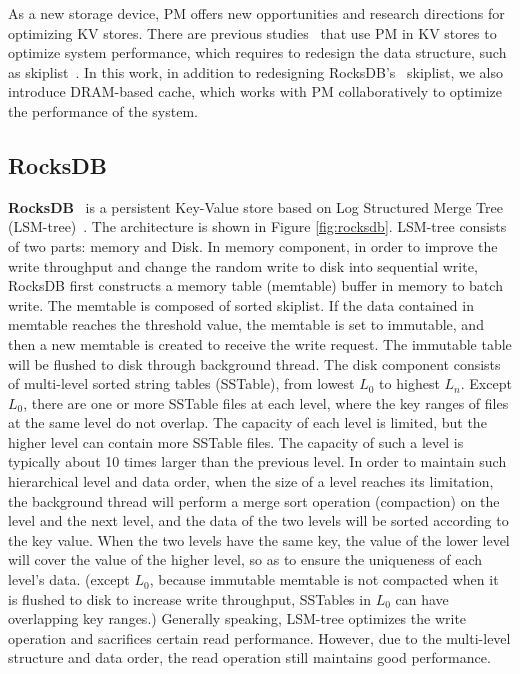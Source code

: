As a new storage device, PM offers new opportunities and research directions for optimizing KV stores. There are previous studies~\cite{NVMRocks,DBLP:conf/usenix/KannanBGAA18,DBLP:conf/usenix/XiaJXS17} that use PM in KV stores to optimize system performance, which requires to redesign the data structure, such as skiplist~\cite{DBLP:conf/usenix/KannanBGAA18, SLMDB}. In this work, in addition to redesigning RocksDB's~\cite{RocksDB} skiplist, we also introduce DRAM-based cache, which works with PM collaboratively to optimize the performance of the system.
\subsection{RocksDB}
\textbf{RocksDB}~\cite{RocksDB} is a persistent Key-Value store based on Log Structured Merge Tree (LSM-tree)~\cite{LSM-tree}. The architecture is shown in Figure \ref{fig:rocksdb}. LSM-tree consists of two parts: memory and Disk. In memory component, in order to improve the write throughput and change the random write to disk into sequential write, RocksDB first constructs a memory table (memtable) buffer in memory to batch write. The memtable is composed of sorted skiplist. If the data contained in memtable reaches the threshold value, the memtable is set to immutable, and then a new memtable is created to receive the write request. The immutable table will be flushed to disk through background thread. The disk component consists of multi-level sorted string tables (SSTable), from lowest $L_0$ to highest $L_n$. Except $L_0$, there are one or more SSTable files at each level, where the key ranges of files at the same level do not overlap. The capacity of each level is limited, but the higher level can contain more SSTable files. The capacity of such a level is typically about 10 times larger than the previous level. In order to maintain such hierarchical level and data order, when the size of a level reaches its limitation, the background thread will perform a merge sort operation (compaction) on the level and the next level, and the data of the two levels will be sorted according to the key value. When the two levels have the same key, the value of the lower level will cover the value of the higher level, so as to ensure the uniqueness of each level's data. (except $L_0$, because immutable memtable is not compacted when it is flushed to disk to increase write throughput, SSTables in $L_0$ can have overlapping key ranges.) Generally speaking, LSM-tree optimizes the write operation and sacrifices certain read performance. However, due to the multi-level structure and data order, the read operation still maintains good performance.

